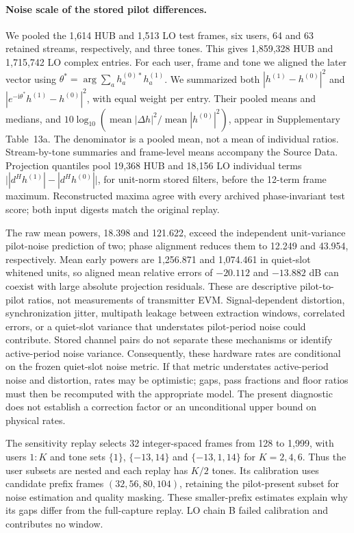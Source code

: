 \documentclass[10pt,letterpaper]{article}
\begin{document}
\FloatBarrier
\paragraph{Noise scale of the stored pilot differences.}
We pooled the 1,614 HUB and 1,513 LO test frames, six users, 64 and 63
retained streams, respectively, and three tones. This gives 1,859,328 HUB
and 1,715,742 LO complex entries. For each user, frame and tone we aligned
the later vector using
\(\theta^*=\arg\sum_a h^{(0)*}_a h^{(1)}_a\).
We summarized both \(|h^{(1)}-h^{(0)}|^2\) and
\(|e^{-\mathrm{i}\theta^*}h^{(1)}-h^{(0)}|^2\), with equal weight per entry.
Their pooled means and medians, and
\(10\log_{10}(\operatorname{mean}|\Delta h|^2/
\operatorname{mean}|h^{(0)}|^2)\), appear in Supplementary Table~13a.
The denominator is a pooled mean, not a mean of individual ratios.
Stream-by-tone summaries and frame-level means accompany the Source Data.
Projection quantiles pool 19,368 HUB and 18,156 LO individual terms
\(\big||d^Hh^{(1)}|-|d^Hh^{(0)}|\big|\), for unit-norm stored filters,
before the 12-term frame maximum. Reconstructed maxima agree with every
archived phase-invariant test score; both input digests match the original replay.

The raw mean powers, 18.398 and 121.622, exceed the independent unit-variance
pilot-noise prediction of two; phase alignment reduces them to 12.249 and
43.954, respectively. Mean early powers are 1,256.871 and 1,074.461 in
quiet-slot whitened units, so aligned mean relative errors of $-20.112$ and
$-13.882$ dB can coexist with large absolute projection residuals. These are
descriptive pilot-to-pilot ratios, not measurements of transmitter EVM.
Signal-dependent distortion, synchronization jitter, multipath leakage
between extraction windows, correlated errors, or a quiet-slot variance
that understates pilot-period noise could contribute. Stored channel pairs
do not separate these mechanisms or identify active-period noise variance.
Consequently, these hardware rates are conditional on the frozen quiet-slot
noise metric. If that metric understates active-period noise and distortion,
rates may be optimistic; gaps, pass fractions and floor ratios must then be
recomputed with the appropriate model. The present diagnostic does not
establish a correction factor or an unconditional upper bound on physical rates.



The sensitivity replay selects 32 integer-spaced frames from 128 to 1,999,
with users $1{:}K$ and tone sets $\{1\}$, $\{-13,14\}$ and $\{-13,1,14\}$
for $K=2,4,6$. Thus the user subsets are nested and each replay has $K/2$
tones. Its calibration uses candidate prefix frames $(32,56,80,104)$,
retaining the pilot-present subset for noise estimation and quality masking.
These smaller-prefix estimates explain why its gaps differ from the
full-capture replay. LO chain B failed calibration and contributes no window.
\end{document}
